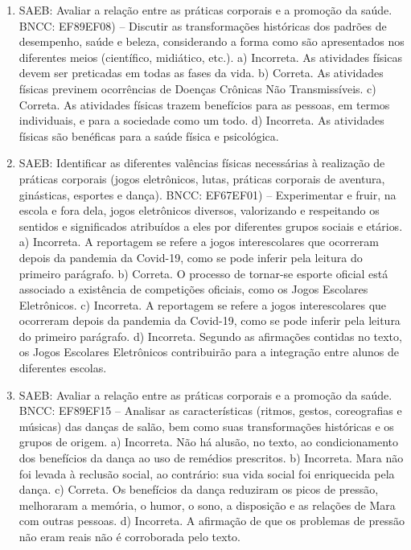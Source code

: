 \begin{enumerate}
\item
SAEB: Avaliar a relação entre as práticas corporais e a promoção da
saúde.
BNCC: EF89EF08) -- Discutir as transformações históricas dos padrões de
desempenho, saúde e beleza, considerando a forma como são apresentados
nos diferentes meios (científico, midiático, etc.).
a) Incorreta. As atividades físicas devem ser preticadas em todas as
fases da vida. 
b) Correta. As atividades físicas previnem ocorrências de Doenças Crônicas Não Transmissíveis.
c) Correta. As atividades físicas trazem benefícios para as pessoas, 
em termos individuais, e para a sociedade como um todo.
d) Incorreta. As atividades físicas são benéficas para a saúde física e
psicológica.

\item
SAEB: Identificar as diferentes valências físicas necessárias à
realização de práticas corporais (jogos eletrônicos, lutas, práticas
corporais de aventura, ginásticas, esportes e dança).
BNCC: EF67EF01) -- Experimentar e fruir, na escola e fora dela, jogos
eletrônicos diversos, valorizando e respeitando os sentidos e
significados atribuídos a eles por diferentes grupos sociais e etários.
a) Incorreta. A reportagem se refere a jogos interescolares que 
ocorreram depois da pandemia da Covid-19, como se pode inferir pela
leitura do primeiro parágrafo. 
b) Correta. O processo de tornar-se esporte oficial está associado a 
existência de competições oficiais, como os Jogos Escolares Eletrônicos.
c) Incorreta. A reportagem se refere a jogos interescolares que 
ocorreram depois da pandemia da Covid-19, como se pode inferir pela
leitura do primeiro parágrafo. 
d) Incorreta. Segundo as afirmações contidas no texto, os Jogos Escolares 
Eletrônicos contribuirão para a integração entre alunos de diferentes
escolas.

\item
SAEB: Avaliar a relação entre as práticas corporais e a promoção da
saúde.
BNCC: EF89EF15 -- Analisar as características (ritmos, gestos,
coreografias e músicas) das danças de salão, bem como suas
transformações históricas e os grupos de origem.
a) Incorreta. Não há alusão, no texto, ao condicionamento dos benefícios
da dança ao uso de remédios prescritos.
b) Incorreta. Mara não foi levada à reclusão social, ao contrário: sua 
vida social foi enriquecida pela dança.
c) Correta. Os benefícios da dança reduziram os picos de pressão, 
melhoraram a memória, o humor, o sono, a disposição e as relações de Mara 
com outras pessoas. 
d) Incorreta. A afirmação de que os problemas de pressão não eram reais 
não é corroborada pelo texto.


\end{enumerate}

